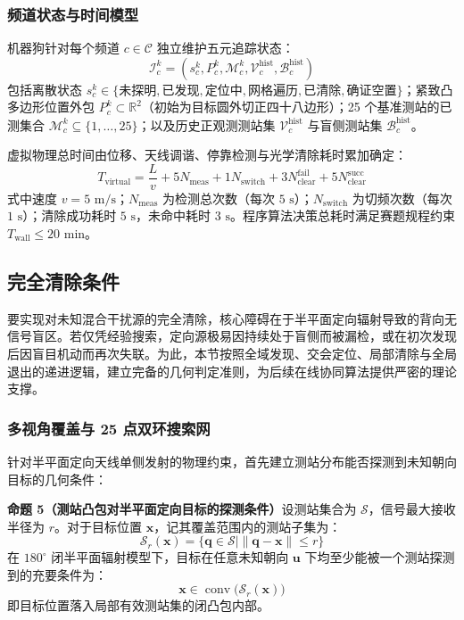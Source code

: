 \documentclass[zihao=-4,a4paper,UTF8]{ctexart}
\begin{document}
\subsubsection{频道状态与时间模型}

机器狗针对每个频道 $c \in \mathcal{C}$ 独立维护五元追踪状态：
\begin{equation}
    \mathcal{I}_c^k = (s_c^k, P_c^k, \mathcal{M}_c^k, \mathcal{V}_c^{\mathrm{hist}}, \mathcal{B}_c^{\mathrm{hist}})
\end{equation}
包括离散状态 $s_c^k \in \{\text{未探明}, \text{已发现}, \text{定位中}, \text{网格遍历}, \text{已清除}, \text{确证空置}\}$；紧致凸多边形位置外包 $P_c^k \subset \mathbb{R}^2$（初始为目标圆外切正四十八边形）；25 个基准测站的已测集合 $\mathcal{M}_c^k \subseteq \{1, \dots, 25\}$；以及历史正观测测站集 $\mathcal{V}_c^{\mathrm{hist}}$ 与盲侧测站集 $\mathcal{B}_c^{\mathrm{hist}}$。

虚拟物理总时间由位移、天线调谐、停靠检测与光学清除耗时累加确定：
\begin{equation}
    T_{\mathrm{virtual}} = \frac{L}{v} + 5 N_{\mathrm{meas}} + 1 N_{\mathrm{switch}} + 3 N_{\mathrm{clear}}^{\mathrm{fail}} + 5 N_{\mathrm{clear}}^{\mathrm{succ}}
\end{equation}
式中速度 $v = 5\text{ m/s}$；$N_{\mathrm{meas}}$ 为检测总次数（每次 $5\text{ s}$）；$N_{\mathrm{switch}}$ 为切频次数（每次 $1\text{ s}$）；清除成功耗时 $5\text{ s}$，未命中耗时 $3\text{ s}$。程序算法决策总耗时满足赛题规程约束 $T_{\mathrm{wall}} \le 20\text{ min}$。

\subsection{完全清除条件}

要实现对未知混合干扰源的完全清除，核心障碍在于半平面定向辐射导致的背向无信号盲区。若仅凭经验搜索，定向源极易因持续处于盲侧而被漏检，或在初次发现后因盲目机动而再次失联。为此，本节按照全域发现、交会定位、局部清除与全局退出的递进逻辑，建立完备的几何判定准则，为后续在线协同算法提供严密的理论支撑。

\subsubsection{多视角覆盖与 25 点双环搜索网}

针对半平面定向天线单侧发射的物理约束，首先建立测站分布能否探测到未知朝向目标的几何条件：

\noindent\textbf{命题 5（测站凸包对半平面定向目标的探测条件）}\quad 设测站集合为 $\mathcal{S}$，信号最大接收半径为 $r$。对于目标位置 $\mathbf{x}$，记其覆盖范围内的测站子集为：
\begin{equation}
    \mathcal{S}_r(\mathbf{x}) = \{\mathbf{q} \in \mathcal{S} \mid \|\mathbf{q} - \mathbf{x}\| \le r\}
\end{equation}
在 $180^\circ$ 闭半平面辐射模型下，目标在任意未知朝向 $\mathbf{u}$ 下均至少能被一个测站探测到的充要条件为：
\begin{equation}
    \mathbf{x} \in \operatorname{conv}\big(\mathcal{S}_r(\mathbf{x})\big)
\end{equation}
即目标位置落入局部有效测站集的闭凸包内部。
\end{document}
